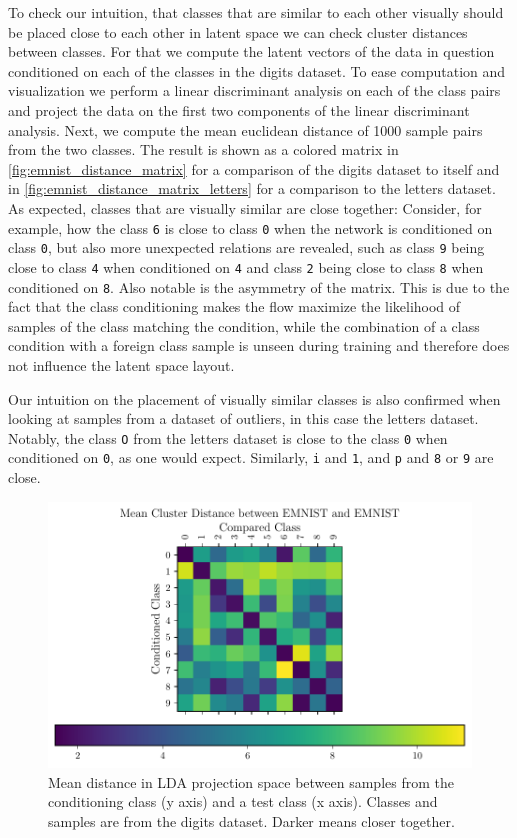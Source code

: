 To check our intuition, that classes that are similar to each other visually
should be placed close to each other in latent space we can check cluster
distances between classes. For that we compute the latent vectors of the data
in question conditioned on each of the classes in the digits dataset. To ease computation
and visualization we perform a linear discriminant analysis on each of the class
pairs and project the data on the first two components of the linear
discriminant analysis. Next, we compute the mean euclidean distance of 1000
sample pairs from the two classes. The result is shown as a colored matrix in
\autoref{fig:emnist_distance_matrix} for a comparison of the digits dataset to itself and
in \autoref{fig:emnist_distance_matrix_letters} for a comparison to the letters
dataset. As expected, classes that are visually similar are close together:
Consider, for example, how the class \texttt{6} is close to class \texttt{0}
when the network is conditioned on class \texttt{0}, but also more unexpected
relations are revealed, such as class \texttt{9} being
close to class \texttt{4} when conditioned on \texttt{4} and class \texttt{2}
being close to class \texttt{8} when
conditioned on \texttt{8}. Also notable is the asymmetry of the matrix. This is due to
the fact that the class conditioning makes the flow maximize the likelihood of
samples of the class matching the condition, while the combination of a class
condition with a foreign class sample is unseen during training and therefore
does not influence the latent space layout.

Our intuition on the placement of visually similar classes is also confirmed
when looking at samples from a dataset of outliers, in this case the letters
dataset. Notably, the class \texttt{O} from the letters dataset is close to the
class \texttt{0} when conditioned on \texttt{0}, as one would expect.
Similarly, \texttt{i} and \texttt{1}, and \texttt{p} and \texttt{8} or
\texttt{9} are close.

\begin{figure}[htpb]
	\centering
	\includegraphics{figures/samples/emnist_distance_matrix_EMNIST_lda.pdf}
	\caption{Mean distance in LDA projection space between samples from the
		conditioning class (y axis) and a test class (x axis). Classes and
		samples are from the digits dataset. Darker means closer
		together.}%
	\label{fig:emnist_distance_matrix}
\end{figure}

